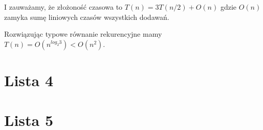 \documentclass[svgnames]{report}
\begin{document}
I zauważamy, że złożoność czasowa to $T(n) = 3 T(n/2) + O(n)$ gdzie $O(n)$ zamyka sumę liniowych czasów wszystkich dodawań.

Rozwiązując typowe równanie rekurencyjne mamy $T(n) = O(n^{log_2 3}) < O(n^2)$.


\section{} %
\section{} %


\chapter{Lista 4}

\chapter{Lista 5}
\end{document}
